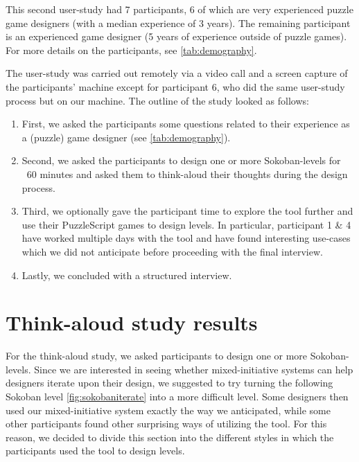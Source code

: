 This second user-study had 7 participants, 6 of which are very experienced puzzle game designers (with a median experience of 3 years). The remaining participant is an experienced game designer (5 years of experience outside of puzzle games). For more details on the participants, see \ref{tab:demography}.

The user-study was carried out remotely via a video call and a screen capture of the participants' machine except for participant 6, who did the same user-study process but on our machine. The outline of the study looked as follows:

\begin{enumerate}
\item  First, we asked the participants some questions related to their experience as a (puzzle) game designer (see \ref{tab:demography}).
\item Second, we asked the participants to design one or more Sokoban-levels for ~60 minutes and asked them to think-aloud their thoughts during the design process.
\item Third, we optionally gave the participant time to explore the tool further and use their PuzzleScript games to design levels. In particular, participant 1 \& 4 have worked multiple days with the tool and have found interesting use-cases which we did not anticipate before proceeding with the final interview.
\item Lastly, we concluded with a structured interview.
\end{enumerate}


\section{Think-aloud study results}
For the think-aloud study, we asked participants to design one or more Sokoban-levels. 
Since we are interested in seeing whether mixed-initiative systems can help designers iterate upon their design, we suggested to try turning the following Sokoban level \ref{fig:sokobaniterate} into a more difficult level. Some designers then used our mixed-initiative system exactly the way we anticipated, while some other participants found other surprising ways of utilizing the tool. For this reason, we decided to divide this section into the different styles in which the participants used the tool to design levels.



